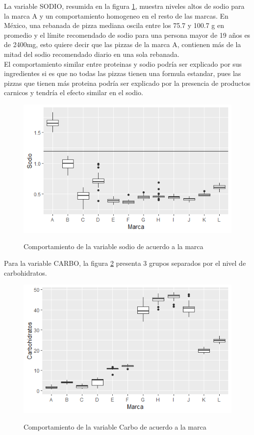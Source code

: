 \documentclass[12pt, letterpaper]{article}
\begin{document}
La variable SODIO, resumida en la figura \ref{i7}, muestra niveles altos de sodio para la marca A y un comportamiento homogeneo en el resto de las marcas. En México, una rebanada de pizza mediana oscila entre los 75.7 y 100.7 g en promedio y el límite recomendado de sodio para una persona mayor de 19 años es de 2400mg, esto quiere decir que las pizzas de la marca A, contienen más de la mitad del sodio recomendado diario en una sola rebanada.\\

El comportamiento similar entre proteinas y sodio podría ser explicado por sus ingredientes si es que no todas las pizzas tienen una formula estandar, pues las pizzas que tienen más proteina podría ser explicado por la presencia de productos carnicos y tendría el efecto similar en el sodio.

\begin{figure}[h]
\centering
\includegraphics[scale=1]{images/sodio.png} 
\label{i7}
\caption{Comportamiento de la variable sodio de acuerdo a la marca}
\end{figure}

Para la variable CARBO, la figura \ref{i8} presenta 3 grupos separados por el nivel de carbohidratos.\\

\begin{figure}[h]
\centering
\includegraphics[scale=1]{images/carbo.png} 
\label{i8}
\caption{Comportamiento de la variable Carbo de acuerdo a la marca}
\end{figure}
\end{document}
